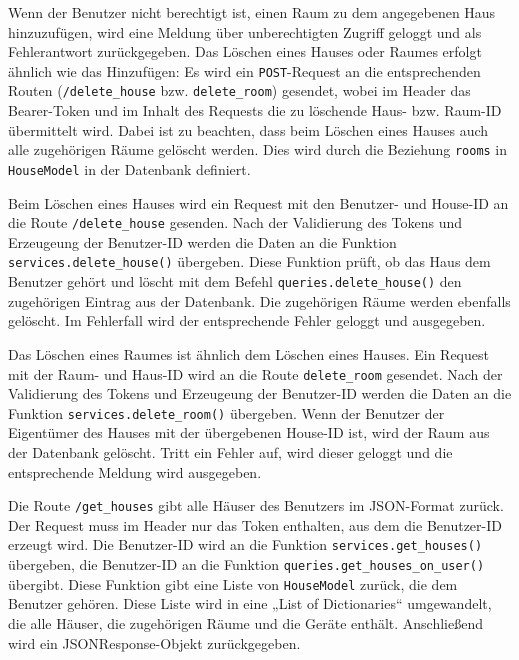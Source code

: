 \documentclass[12pt, letterpaper]{article}
\begin{document}
  \par Wenn der Benutzer nicht berechtigt ist, einen Raum zu dem angegebenen Haus hinzuzufügen, wird eine Meldung über unberechtigten Zugriff geloggt und als Fehlerantwort zurückgegeben.
  Das Löschen eines Hauses oder Raumes erfolgt ähnlich wie das Hinzufügen: Es wird ein \texttt{POST}-Request an die entsprechenden Routen (\texttt{/delete\_house} bzw. \texttt{delete\_room}) gesendet, wobei im Header das Bearer-Token und im Inhalt des Requests die zu löschende Haus- bzw. Raum-ID übermittelt wird. Dabei ist zu beachten, dass beim Löschen eines Hauses auch alle zugehörigen Räume gelöscht werden. Dies wird durch die Beziehung \texttt{rooms} in \texttt{HouseModel} in der Datenbank definiert. 
  \par Beim Löschen eines Hauses wird ein Request mit den Benutzer- und House-ID an die Route \texttt{/delete\_house} gesenden. Nach der Validierung des Tokens und Erzeugeung der Benutzer-ID werden die Daten an die Funktion \texttt{services.delete\_house()} übergeben. Diese Funktion prüft, ob das Haus dem Benutzer gehört und löscht mit dem Befehl \texttt{queries.delete\_house()} den zugehörigen Eintrag aus der Datenbank. Die zugehörigen Räume werden ebenfalls gelöscht. Im Fehlerfall wird der entsprechende Fehler geloggt und ausgegeben. 
  \par Das Löschen eines Raumes ist ähnlich dem Löschen eines Hauses. Ein Request mit der Raum- und Haus-ID wird an die Route \texttt{delete\_room} gesendet. Nach der Validierung des Tokens und Erzeugeung der Benutzer-ID werden die Daten an die Funktion \texttt{services.delete\_room()} übergeben. Wenn der Benutzer der Eigentümer des Hauses mit der übergebenen House-ID ist, wird der Raum aus der Datenbank gelöscht. Tritt ein Fehler auf, wird dieser geloggt und die entsprechende Meldung wird ausgegeben.
  \par Die Route \texttt{/get\_houses} gibt alle Häuser des Benutzers im JSON-Format zurück. Der Request muss im Header nur das Token enthalten, aus dem die Benutzer-ID erzeugt wird. Die Benutzer-ID wird an die Funktion \texttt{services.get\_houses()} übergeben, die Benutzer-ID an die Funktion \texttt{queries.get\_houses\_on\_user()} übergibt. Diese Funktion gibt eine Liste von \texttt{HouseModel} zurück, die dem Benutzer gehören. Diese Liste wird in eine „List of Dictionaries“ umgewandelt, die alle Häuser, die zugehörigen Räume und die Geräte enthält. Anschließend wird ein JSONResponse-Objekt zurückgegeben.
\end{document}
